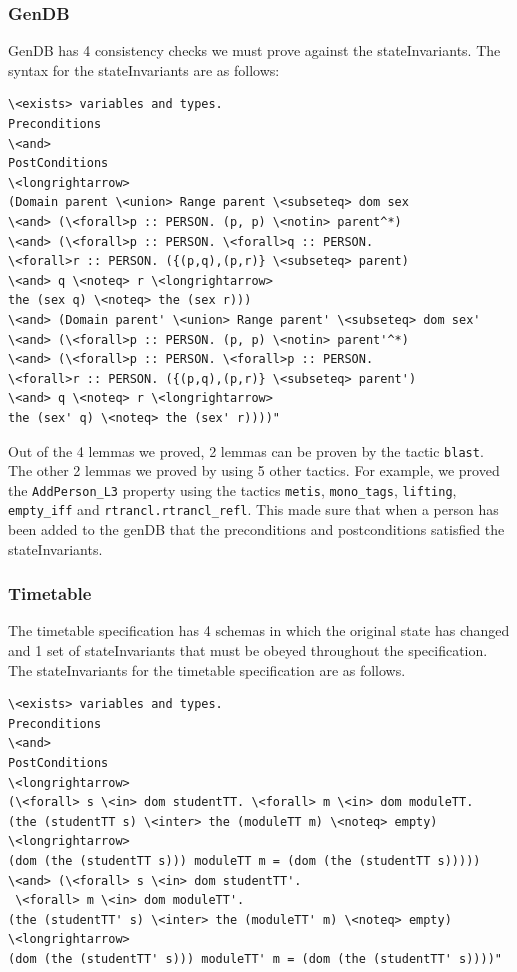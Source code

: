 \subsubsection{GenDB}

GenDB has 4 consistency checks we must prove against the stateInvariants. The
syntax for the stateInvariants are as follows:

\begin{verbatim}
\<exists> variables and types.
Preconditions
\<and>
PostConditions
\<longrightarrow>
(Domain parent \<union> Range parent \<subseteq> dom sex
\<and> (\<forall>p :: PERSON. (p, p) \<notin> parent^*)
\<and> (\<forall>p :: PERSON. \<forall>q :: PERSON.
\<forall>r :: PERSON. ({(p,q),(p,r)} \<subseteq> parent)
\<and> q \<noteq> r \<longrightarrow>
the (sex q) \<noteq> the (sex r)))
\<and> (Domain parent' \<union> Range parent' \<subseteq> dom sex'
\<and> (\<forall>p :: PERSON. (p, p) \<notin> parent'^*)
\<and> (\<forall>p :: PERSON. \<forall>p :: PERSON.
\<forall>r :: PERSON. ({(p,q),(p,r)} \<subseteq> parent')
\<and> q \<noteq> r \<longrightarrow>
the (sex' q) \<noteq> the (sex' r))))"
\end{verbatim}

Out of the 4 lemmas we proved, 2 lemmas can be proven by the tactic \verb|blast|.
The other 2 lemmas we proved by using 5 other tactics. For example, we proved the
\verb|AddPerson_L3| property using the tactics \verb|metis|, \verb|mono_tags|,
\verb|lifting|, \verb|empty_iff| and \verb|rtrancl.rtrancl_refl|. This made sure
that when a person has been added to the genDB that the preconditions and
postconditions satisfied the stateInvariants.

\subsubsection{Timetable}

The timetable specification has 4 schemas in which the original state has
changed and 1 set of stateInvariants that must be obeyed throughout the
specification. The stateInvariants for the timetable specification are as
follows.

\begin{verbatim}
\<exists> variables and types.
Preconditions
\<and>
PostConditions
\<longrightarrow>
(\<forall> s \<in> dom studentTT. \<forall> m \<in> dom moduleTT.
(the (studentTT s) \<inter> the (moduleTT m) \<noteq> empty)
\<longrightarrow>
(dom (the (studentTT s))) moduleTT m = (dom (the (studentTT s)))))
\<and> (\<forall> s \<in> dom studentTT'.
 \<forall> m \<in> dom moduleTT'.
(the (studentTT' s) \<inter> the (moduleTT' m) \<noteq> empty)
\<longrightarrow>
(dom (the (studentTT' s))) moduleTT' m = (dom (the (studentTT' s))))"
\end{verbatim}

